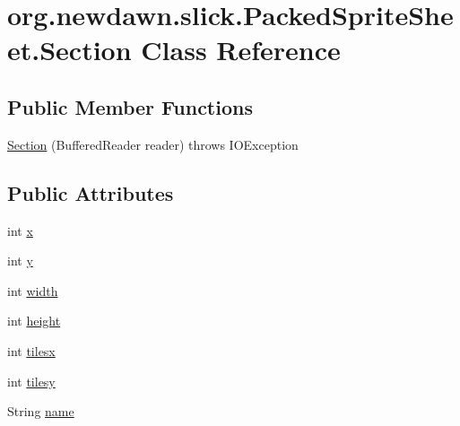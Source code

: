 \hypertarget{classorg_1_1newdawn_1_1slick_1_1_packed_sprite_sheet_1_1_section}{}\section{org.\+newdawn.\+slick.\+Packed\+Sprite\+Sheet.\+Section Class Reference}
\label{classorg_1_1newdawn_1_1slick_1_1_packed_sprite_sheet_1_1_section}
\subsection*{Public Member Functions}
\begin{DoxyCompactItemize}
\item 
\mbox{\hyperlink{classorg_1_1newdawn_1_1slick_1_1_packed_sprite_sheet_1_1_section_a5fce67d90dcd951945532a9711f6c5d9}{Section}} (Buffered\+Reader reader)  throws I\+O\+Exception 
\end{DoxyCompactItemize}
\subsection*{Public Attributes}
\begin{DoxyCompactItemize}
\item 
int \mbox{\hyperlink{classorg_1_1newdawn_1_1slick_1_1_packed_sprite_sheet_1_1_section_ae603cab589363ffc1b833258b559937b}{x}}
\item 
int \mbox{\hyperlink{classorg_1_1newdawn_1_1slick_1_1_packed_sprite_sheet_1_1_section_a7d86b43b67407affcf680d1cd8a779b6}{y}}
\item 
int \mbox{\hyperlink{classorg_1_1newdawn_1_1slick_1_1_packed_sprite_sheet_1_1_section_a8ba0f4e09e47b11d4d7a3d49716d5878}{width}}
\item 
int \mbox{\hyperlink{classorg_1_1newdawn_1_1slick_1_1_packed_sprite_sheet_1_1_section_a124dc6dd1dace77f4781fff3c1f6888c}{height}}
\item 
int \mbox{\hyperlink{classorg_1_1newdawn_1_1slick_1_1_packed_sprite_sheet_1_1_section_acc4f72d41639de1c3175edd200052884}{tilesx}}
\item 
int \mbox{\hyperlink{classorg_1_1newdawn_1_1slick_1_1_packed_sprite_sheet_1_1_section_aa43b4c5021af79e89586876435b2a9cc}{tilesy}}
\item 
String \mbox{\hyperlink{classorg_1_1newdawn_1_1slick_1_1_packed_sprite_sheet_1_1_section_ae0f0486e047a283f5beb7d7a42311d07}{name}}
\end{DoxyCompactItemize}


